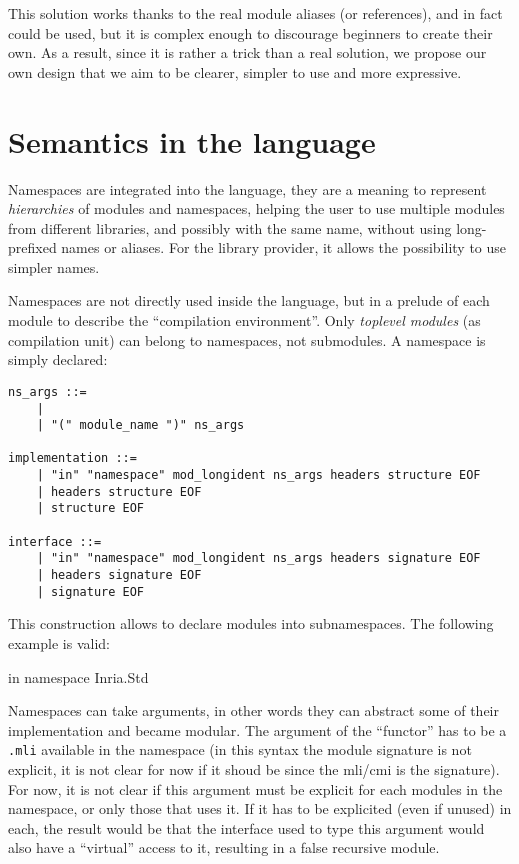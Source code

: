\documentclass[11pt,a4paper]{article}
\begin{document}
This solution works thanks to the real module aliases (or references), and in
fact could be used, but it is complex enough to discourage beginners to create
their own. As a result, since it is rather a trick than a real solution, we
propose our own design that we aim to be clearer, simpler to use and more
expressive.

\section{Semantics in the language}

Namespaces are integrated into the language, they are a meaning to represent
\emph{hierarchies} of modules and namespaces, helping the user to use multiple
modules from different libraries, and possibly with the same name, without using
long-prefixed names or aliases. For the library provider, it allows the
possibility to use simpler names.

Namespaces are not directly used inside the language, but in a prelude of each
module to describe the ``compilation environment''. Only \emph{toplevel modules}
(as compilation unit) can belong to namespaces, not submodules. A namespace is
simply declared: 

\begin{verbatim}
ns_args ::=
    | 
    | "(" module_name ")" ns_args

implementation ::=
    | "in" "namespace" mod_longident ns_args headers structure EOF
    | headers structure EOF
    | structure EOF

interface ::=
    | "in" "namespace" mod_longident ns_args headers signature EOF
    | headers signature EOF
    | signature EOF
\end{verbatim}

This construction allows to declare modules into subnamespaces. The following
example is valid:

\begin{OCaml}
in namespace Inria.Std
\end{OCaml}

Namespaces can take arguments, in other words they can abstract some of their
implementation and became modular. The argument of the ``functor'' has to be a
\texttt{.mli} available in the namespace (in this syntax the module signature is
not explicit, it is not clear for now if it shoud be since the mli/cmi is the
signature). For now, it is not clear if this argument must be explicit for each
modules in the namespace, or only those that uses it. If it has to be explicited
(even if unused) in each, the result would be that the interface used to type
this argument would also have a ``virtual'' access to it, resulting in a false
recursive module.
\end{document}
